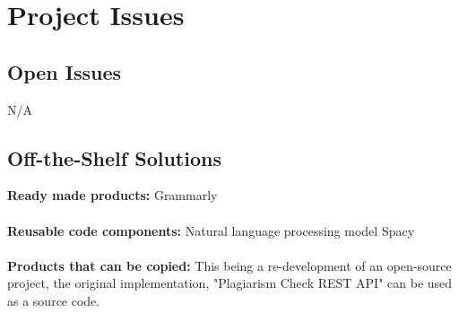\documentclass[12pt, titlepage]{article}
\begin{document}
\section{Project Issues}

\subsection{Open Issues}
N/A

\subsection{Off-the-Shelf Solutions}
\textbf{Ready made products:} Grammarly \\
\\
\textbf{Reusable code components:} Natural language processing model Spacy \\
\\ 
\textbf{Products that can be copied:} This being a re-development of an open-source project, the original implementation, "Plagiarism Check REST API" can be used as a source code. 
\end{document}
